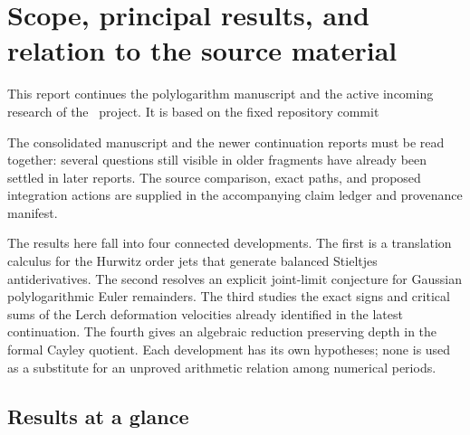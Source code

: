 \section{Scope, principal results, and relation to the source material}
\label{sec:scope}

This report continues the polylogarithm manuscript and the active incoming
research of the \repo\ project. It is based on the fixed repository commit
\begin{center}\small\texttt{\baselinecommit}\end{center}
The consolidated manuscript and the newer
continuation reports must be read together: several questions still visible
in older fragments have already been settled in later reports. The source
comparison, exact paths, and proposed integration actions are supplied in
the accompanying claim ledger and provenance manifest.

The results here fall into four connected developments. The first is a
translation calculus for the Hurwitz order jets that generate balanced
Stieltjes antiderivatives. The second resolves an explicit joint-limit
conjecture for Gaussian polylogarithmic Euler remainders. The third studies
the exact signs and critical sums of the Lerch deformation velocities
already identified in the latest continuation. The fourth gives an
algebraic reduction preserving depth in the formal Cayley quotient.
Each development has its own hypotheses; none is used as a substitute for
an unproved arithmetic relation among numerical periods.

\subsection{Results at a glance}

